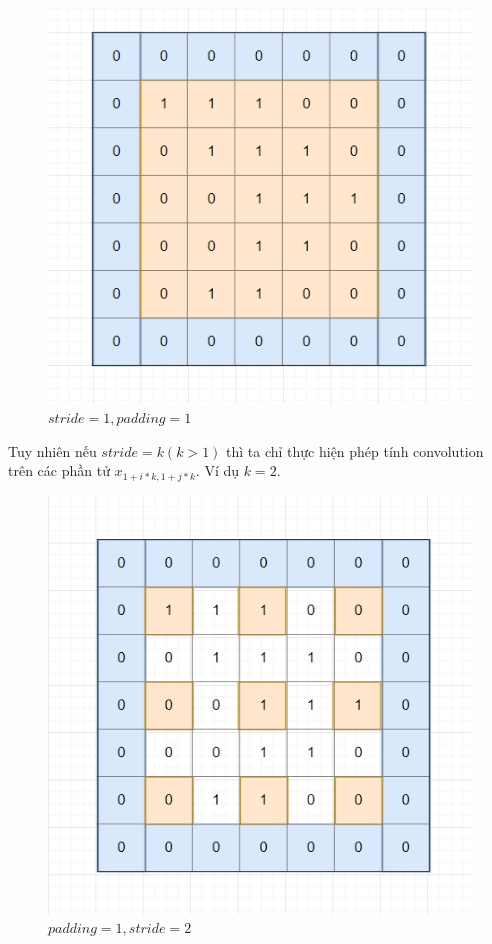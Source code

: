 \begin{itemize}
\FloatBarrier
\begin{figure}[htp]
\begin{center}
\includegraphics[scale=0.65]{chap2/c2_figs/11.png}
\end{center}
\caption{$stride=1, padding=1$}
\label{fig:padding}
\end{figure}
\FloatBarrier

Tuy nhiên nếu $stride=k (k > 1)$ thì ta chỉ thực hiện phép tính convolution trên các phần tử $x_{1+i*k,1+j*k}$. Ví dụ $k = 2$.

\FloatBarrier
\begin{figure}[htp]
\begin{center}
\includegraphics[scale=0.65]{chap2/c2_figs/12.png}
\end{center}
\caption{$padding=1, stride=2$}
\label{fig:padding,stride}
\end{figure}
\FloatBarrier


\end{itemize}
